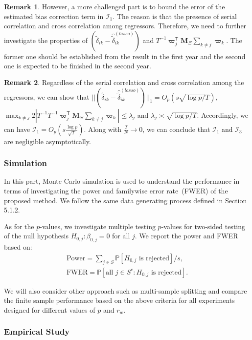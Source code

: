 \documentclass[11pt,a4paper]{article}
\newcommand{\Bvarpi}{\boldsymbol{\varpi}}
\newcommand{\MBM}{\mathbf{M}}
\newcommand{\tp}{\mathsf{T}}
\theoremstyle{definition}
\newtheorem{Remark}{Remark}%
\begin{document}
\begin{Remark}
However,  a more challenged part is to bound the error of the estimated bias correction term in $\mathcal{I}_1$. The reason is that the presence of serial correlation and cross correlation among regressors. Therefore, we need to further investigate the properties of $\left(\tilde\delta_{ik}-\hat{\tilde{\delta}}_{ik}^{(lasso)}\right)$ and $T^{-1}\Bvarpi_{j}^{\tp}\MBM_{\Xi}\sum_{k\neq j}\Bvarpi_{k}$. The former one should be established from the result in the first year and the second one is expected to be finished in the second year. 
\end{Remark}

\begin{Remark}
Regardless of the serial correlation and cross correlation among the regressors, we can show that $||\left(\tilde\delta_{ik}-\hat{\tilde{\delta}}_{ik}^{(lasso)}\right)||_1=O_p(s\sqrt{\log p/T})$,
$\max_{k\neq j}2|T^{-1}T^{-1}\Bvarpi_{j}^{\tp}\MBM_{\Xi}\sum_{k\neq j}\Bvarpi_{k}|\leq \lambda_j$ and $\lambda_j\asymp\sqrt{\log p/T}$. Accordingly, we can have $\mathcal{I}_1=O_p\left(s\frac{\log p}{\sqrt{T}}\right)$. Along with $\frac{T}{N}\rightarrow 0$, we can conclude that $\mathcal{I}_1$ and $\mathcal{I}_3$ are negligible asymptotically. 
\end{Remark}


\subsubsection{Simulation}
In this part, Monte Carlo simulation is used to understand the performance in terms of investigating the power and familywise error rate~(FWER) of the proposed method. We follow the same data generating process defined in Section 5.1.2.

As for the $p$-values, we investigate multiple testing $p$-values for two-sided testing of the null hypothesis $H_{0,j}:\beta_{0,j}=0$ for all $j$. We report the power and FWER based on:
\begin{align*}
\mathrm{Power}=\sum_{j\in S}\mathbb{P}[H_{0,j}\mbox{ is rejected}]/s,\\
\mathrm{FWER}=\mathbb{P}[\mbox{all }j\in S^c:H_{0,j}\mbox{ is rejected}].
\end{align*}

We will also consider other approach such as multi-sample splitting and compare the finite sample performance based on the above criteria for all experiments designed for different values of $p$ and $r_w$.
\subsubsection{Empirical Study}
\end{document}
